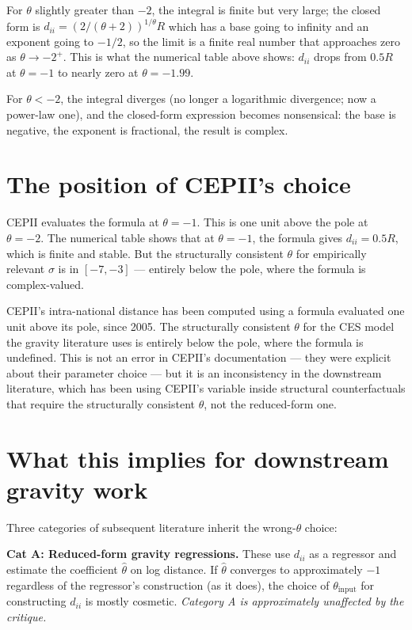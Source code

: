 \documentclass[11pt,letterpaper,oneside]{book}
\theoremstyle{definition}
\theoremstyle{remark}
\begin{document}
For $\theta$ slightly greater than $-2$, the integral is finite but very large; the closed form is $d_{ii} = (2/(\theta+2))^{1/\theta} R$ which has a base going to infinity and an exponent going to $-1/2$, so the limit is a finite real number that approaches zero as $\theta \to -2^+$. This is what the numerical table above shows: $d_{ii}$ drops from $0.5R$ at $\theta = -1$ to nearly zero at $\theta = -1.99$.

For $\theta < -2$, the integral diverges (no longer a logarithmic divergence; now a power-law one), and the closed-form expression becomes nonsensical: the base is negative, the exponent is fractional, the result is complex.

\section{The position of CEPII's choice}

CEPII evaluates the formula at $\theta = -1$. This is one unit above the pole at $\theta = -2$. The numerical table shows that at $\theta = -1$, the formula gives $d_{ii} = 0.5 R$, which is finite and stable. But the structurally consistent $\theta$ for empirically relevant $\sigma$ is in $[-7, -3]$ --- entirely below the pole, where the formula is complex-valued.

\begin{tcolorbox}[insight]
CEPII's intra-national distance has been computed using a formula evaluated one unit above its pole, since 2005. The structurally consistent $\theta$ for the CES model the gravity literature uses is entirely below the pole, where the formula is undefined. This is not an error in CEPII's documentation --- they were explicit about their parameter choice --- but it is an inconsistency in the downstream literature, which has been using CEPII's variable inside structural counterfactuals that require the structurally consistent $\theta$, not the reduced-form one.
\end{tcolorbox}

\section{What this implies for downstream gravity work}

Three categories of subsequent literature inherit the wrong-$\theta$ choice:

\textbf{Cat A: Reduced-form gravity regressions.} These use $d_{ii}$ as a regressor and estimate the coefficient $\hat\theta$ on log distance. If $\hat\theta$ converges to approximately $-1$ regardless of the regressor's construction (as it does), the choice of $\theta_{\text{input}}$ for constructing $d_{ii}$ is mostly cosmetic. \emph{Category A is approximately unaffected by the critique.}
\end{document}
